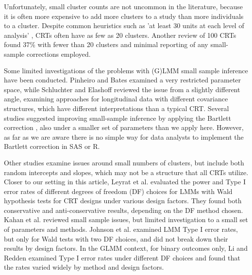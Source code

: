 \documentclass[twocolumn]{bmcart}%
\begin{document}
Unfortunately, small cluster counts are not uncommon in the literature, because it is often more expensive to add more clusters to a study than more individuals to a cluster. Despite common heuristics such as 'at least 30 units at each level of analysis' \cite{kreft_introducing_1998}, CRTs often have as few as 20 clusters. Another review of 100 CRTs \cite{kahan_increased_2016} found 37\% with fewer than 20 clusters and minimal reporting of any small-sample corrections employed.

Some limited investigations of the problems with (G)LMM small sample inference have been conducted. Pinheiro and Bates \cite{pinheiro_mixed-effects_2009} examined a very restricted parameter space, while Schluchter and Elashoff \cite{schluchter_small-sample_1990} reviewed the issue from a slightly different angle, examining approaches for longitudinal data with different covariance structures, which have different interpretations than a typical CRT. Several studies \cite{zucker_improved_2000, melo_improved_2009, manor_small_2004, stein_alternatives_2014} suggested improving small-sample inference by applying the Bartlett correction \cite{bartlett_properties_1937}, also under a smaller set of parameters than we apply here. However, as far as we are aware there is no simple way for data analysts to implement the Bartlett correction in SAS or R.  

Other studies \cite{luke_evaluating_2017, maas_sufficient_2005, bell_dancing_2010} examine issues around small numbers of clusters, but include both random intercepts and slopes, which may not be a structure that all CRTs utilize. Closer to our setting in this article, Leyrat et al. \cite{leyrat_cluster_2018} evaluated the power and Type I error rates of different degrees of freedom (DF) choices for LMMs with Wald hypothesis tests for CRT designs under various design factors. They found both conservative and anti-conservative results, depending on the DF method chosen. Kahan et al. \cite{kahan_increased_2016} reviewed small sample issues, but limited investigation to a small set of parameters and methods. Johnson et al. \cite{johnson_recommendations_2015} examined LMM Type I error rates, but only for Wald tests with two DF choices, and did not break down their results by design factors. In the GLMM context, for binary outcomes only, Li and Redden \cite{li_comparing_2015} examined Type I error rates under different DF choices and found that the rates varied widely by method and design factors.
\end{document}
